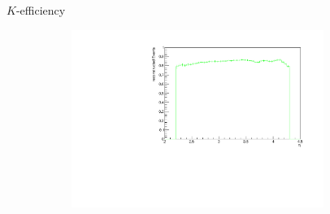 \documentclass[11pt]{beamer}
\begin{document}
\begin{frame}{$K$-efficiency}
\begin{figure}
\begin{subfigure}{0.45\textwidth}
\end{subfigure}
\begin{subfigure}{0.45\textwidth}
\includegraphics[width=0.9\textwidth]{up_pdf/single/tot/h_eta_reco_K.pdf}
\end{subfigure}
\end{figure}
\end{frame}
\end{document}
